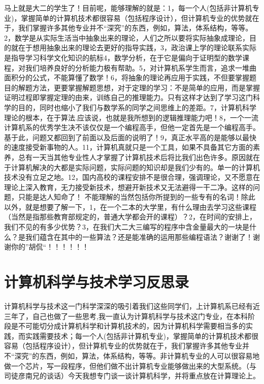 马上就是大二的学生了！目前呢，能够理解的就是：1，每一个人(包括非计算机专业)，掌握简单的计算机技术都很容易（包括程序设计），但计算机专业的优势就在于，我们掌握许多其他专业并不“深究”的东西，例如，算法，体系结构，等等。2，数学是从实际生活当中抽象出来的理论，人们之所以要将实际抽象成理论，目的就在于想用抽象出来的理论去更好的指导实践，3，政治课上学的理论联系实际是指导学习科学文化知识的航标4，数学分析，在于它是偏向于证明型的数学课程，对我们培养良好的分析能力极有帮助。5，对计算机系学生而言，追求一堆曲面积分的公式，不能算懂了数学！6，将抽象的理论再应用于实践，不但要掌握题目的解题方法，更要掌握解题思想，对于定理的学习：不是简单的应用，而是掌握证明过程即掌握定理的由来，训练自己的推理能力。只有这样才达到了学习这门科学的目的，同时也缩小了我们与数学系的同学之间思维上的差距。7，计算机科学理论的根本，在于算法.应该说，也就是我所想到的逻辑推理能力吧！8，一个一流计算机系的优秀学生决不该仅仅是一个编程高手，但他一定首先是一个编程高手。基于此，问题又都回到了前面以及后面的说明了！9，真正水平高的是能够以最快的速度接受新事物的人。11，计算机真就只是一个工具，如果不具备其它方面的素养，总有一天当其他专业性人才掌握了计算机技术后将比我们出色许多。原因就在于计算机解决的大都是实际问题，实际问题的知识却是我们少有的。单一的计算机技术没有立足之地。12，国内高校的课程安排不是很合理，强调理论，又不愿意在理论上深入教育，无力接受新技术，想避开新技术又无法避得一干二净。这样的问题，只能是达人知命了！
不能理解的当然包括你所提到的一些专有的名词！除此以外，就是想要了解一下，1，在一个二本的大学里，有什么理由去学习这些课程（当然是指那些教育部规定的，普通大学都会开的课程）？2，在时间的安排上，我们不见的有多少优势？3，在我们大二大三编写的程序中含金量最大的一块是什么？是我们蕴含在其中的一些算法？还是能准确的运用那些编程语法？谢谢了！谢谢你的”胡侃“！！！！！！





\chapter{计算机科学与技术学习反思录}

计算机科学与技术这一门科学深深的吸引着我们这些同学们，上计算机系已经有近三年了，自己也做了一些思考,我一直认为计算机科学与技术这门专业，在本科阶段是不可能切分成计算机科学和计算机技术的，因为计算机科学需要相当多的实践，而实践需要技术；每一个人(包括非计算机专业)，掌握简单的计算机技术都很容易（包括程序设计），但计算机专业的优势就在于，我们掌握许多其他专业并不“深究”的东西，例如，算法，体系结构，等等。非计算机专业的人可以很容易地做一个芯片，写一段程序，但他们做不出计算机专业能够做出来的大型系统。（与司徒彦南兄的谈话）今天我想专门谈一谈计算机科学，并将重点放在计算理论上。


